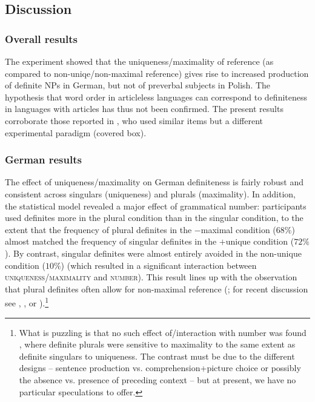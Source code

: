 \documentclass[output=paper]{langscibook}
\begin{document}
\subsection{Discussion}\largerpage[2]

\subsubsection{Overall results}

The experiment showed that the uniqueness/maximality of reference (as compared to non-uniqe/non-maximal reference) gives rise to increased production of definite NPs in German, but not of preverbal subjects in Polish. The hypothesis that word order in articleless languages can correspond to definiteness in languages with articles has thus not been confirmed. The present results corroborate those reported in \citet{Simik.Demian2020}, who used similar items but a different experimental paradigm (covered box).


\subsubsection{German results}

The effect of uniqueness/maximality on German definiteness is fairly robust and consistent across singulars (uniqueness) and plurals (maximality). In addition, the statistical model revealed a major effect of grammatical number: participants used definites more in the plural condition than in the singular condition, to the extent that the frequency of plural definites in the \textsf{$-$maximal} condition ($68\%$) almost matched the frequency of singular definites in the \textsf{$+$unique} condition ($72\%$). By contrast, singular definites were almost entirely avoided in the non-unique condition ($10\%$) (which resulted in a significant interaction between \textsc{uniqueness/maximality} and \textsc{number}). This result lines up with the observation that plural definites often allow for non-maximal reference (\citealt{Fodor1970}; for recent discussion see \citealt{Brisson1998}, \citealt{Lasersohn1999}, or \citealt{Kriz2016}).\footnote{What is puzzling is that no such effect of/interaction with number was found \citet{Simik.Demian2020}, where definite plurals were sensitive to maximality to the same extent as definite singulars to uniqueness. The contrast must be due to the different designs -- sentence production vs. comprehension+picture choice or possibly the absence vs. presence of preceding context -- but at present, we have no particular speculations to offer.}
\end{document}
